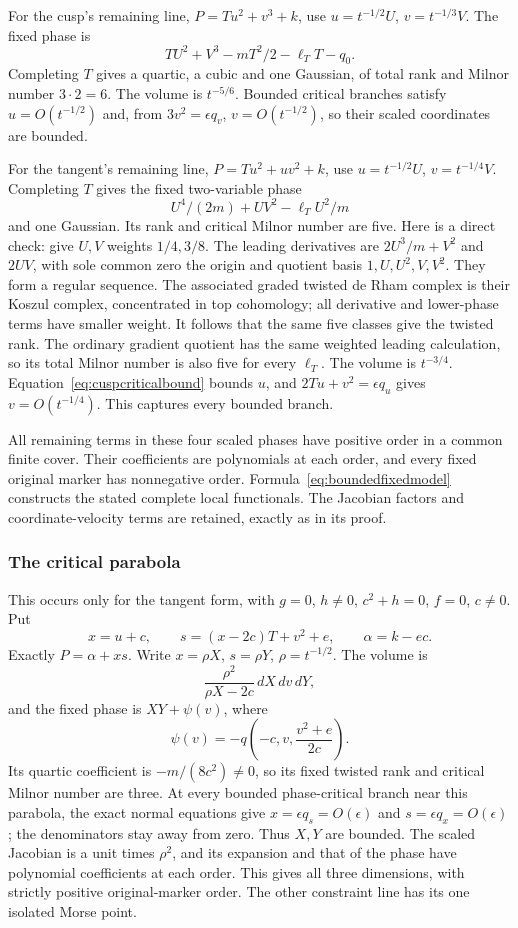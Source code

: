 For the cusp's remaining line, $P=T u^2+v^3+k$, use
$u=t^{-1/2}U$, $v=t^{-1/3}V$. The fixed phase is
\[
 TU^2+V^3-mT^2/2-\ell_TT-q_0.
\]
Completing $T$ gives a quartic, a cubic and one Gaussian, of
total rank and Milnor number $3\cdot2=6$. The volume is
$t^{-5/6}$. Bounded critical branches satisfy $u=O(t^{-1/2})$
and, from $3v^2=\epsilon q_v$, $v=O(t^{-1/2})$, so their
scaled coordinates are bounded.

For the tangent's remaining line, $P=T u^2+uv^2+k$, use
$u=t^{-1/2}U$, $v=t^{-1/4}V$. Completing $T$ gives the fixed
two-variable phase
\[
 U^4/(2m)+UV^2-\ell_TU^2/m
\]
and one Gaussian. Its rank and critical Milnor number are five.
Here is a direct check: give $U,V$ weights $1/4,3/8$. The
leading derivatives are $2U^3/m+V^2$ and $2UV$, with sole
common zero the origin and quotient basis
$1,U,U^2,V,V^2$. They form a regular sequence. The associated
graded twisted de Rham complex is their Koszul complex,
concentrated in top cohomology; all derivative and lower-phase
terms have smaller weight. It follows that the same five
classes give the twisted rank. The ordinary gradient quotient
has the same weighted leading calculation, so its total
Milnor number is also five for every $\ell_T$. The volume is
$t^{-3/4}$. Equation~\eqref{eq:cuspcriticalbound} bounds $u$,
and $2Tu+v^2=\epsilon q_u$ gives $v=O(t^{-1/4})$. This
captures every bounded branch.

All remaining terms in these four scaled phases have positive
order in a common finite cover. Their coefficients are
polynomials at each order, and every fixed original marker has
nonnegative order. Formula~\eqref{eq:boundedfixedmodel} constructs
the stated complete local functionals. The Jacobian factors and
coordinate-velocity terms are retained, exactly as in its proof.

\subsubsection*{The critical parabola}

This occurs only for the tangent form, with $g=0$, $h\ne0$,
$c^2+h=0$, $f=0$, $c\ne0$. Put
\[
 x=u+c,\qquad s=(x-2c)T+v^2+e,\qquad\alpha=k-ec.
\]
Exactly $P=\alpha+xs$. Write $x=\rho X$, $s=\rho Y$,
$\rho=t^{-1/2}$. The volume is
\[
 \frac{\rho^2}{\rho X-2c}\,dX\,dv\,dY,
\]
and the fixed phase is $XY+\psi(v)$, where
\[
 \psi(v)=-q\!\left(-c,v,\frac{v^2+e}{2c}\right).
\]
Its quartic coefficient is $-m/(8c^2)\ne0$, so its fixed
twisted rank and critical Milnor number are three. At every
bounded phase-critical branch near this parabola, the exact
normal equations give $x=\epsilon q_s=O(\epsilon)$ and
$s=\epsilon q_x=O(\epsilon)$; the denominators stay away
from zero. Thus $X,Y$ are bounded. The scaled Jacobian is a
unit times $\rho^2$, and its expansion and that of the phase
have polynomial coefficients at each order. This gives all
three dimensions, with strictly positive original-marker order.
The other constraint line has its one isolated Morse point.

